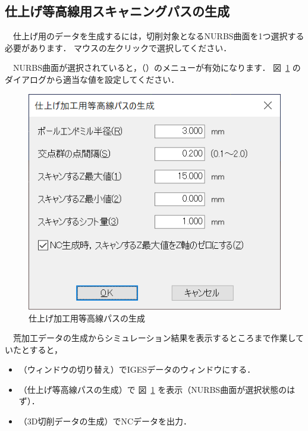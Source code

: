 
\subsection{仕上げ等高線用スキャニングパスの生成}
　仕上げ用のデータを生成するには，切削対象となるNURBS曲面を1つ選択する必要があります．
マウスの左クリックで選択してください．

　NURBS曲面が選択されていると，（）のメニューが有効になります．
図~\ref{fig:ncvc31} のダイアログから適当な値を設定してください．

\begin{figure}[H]
\centering
\includegraphics{No3/fig/fig31.png}
\caption{仕上げ加工用等高線パスの生成}
\label{fig:ncvc31}
\end{figure}

　荒加工データの生成からシミュレーション結果を表示するところまで作業していたとすると，

\begin{itemize}
\item {}（ウィンドウの切り替え）でIGESデータのウィンドウにする．
\item {}（仕上げ等高線パスの生成）で 図~\ref{fig:ncvc31} を表示（NURBS曲面が選択状態のはず）．
\item {}（3D切削データの生成）でNCデータを出力．
\end{itemize}

